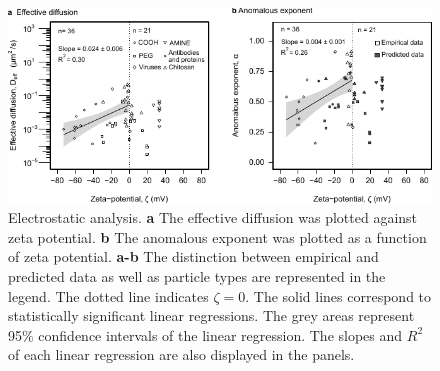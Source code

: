 \documentclass[aps,prl,preprint,superscriptaddress,showkeys,linenumbers]{revtex4-1}
\begin{document}
\begin{figure}
\centering
\includegraphics[width = 15 cm]{Figure_Charge.pdf}
\caption{Electrostatic analysis. \textbf{a} The effective diffusion was plotted against zeta potential. \textbf{b} The anomalous exponent was plotted as a function of zeta potential.  \textbf{a-b} The distinction between empirical and predicted data as well as particle types are represented in the legend. The dotted line indicates $\zeta = 0$.  The solid lines correspond to statistically significant linear regressions. The grey areas represent 95$\%$ confidence intervals of the linear regression. The slopes and $R^2$ of each linear regression are also displayed in the panels. 
}
\label{fig:ChargeDif}
\end{figure}  

\clearpage
\end{document}
